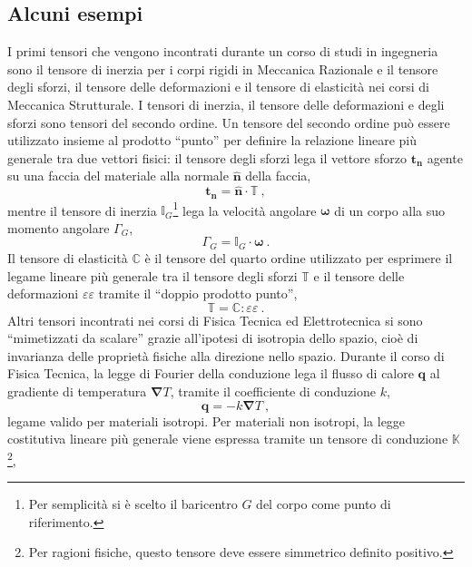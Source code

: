 \subsection{Alcuni esempi}
 I primi tensori che vengono incontrati durante un corso di studi in ingegneria sono il tensore di inerzia per i corpi rigidi in Meccanica Razionale e il tensore degli sforzi, il tensore delle deformazioni e il tensore di elasticità nei corsi di Meccanica Strutturale.
 I tensori di inerzia, il tensore delle deformazioni e degli sforzi sono tensori del secondo ordine. Un tensore del secondo ordine può essere utilizzato insieme al prodotto ``punto'' per definire la relazione lineare più generale tra due vettori fisici: il tensore degli sforzi lega il vettore sforzo $\bm{t_n}$ agente su una faccia del materiale alla normale $\bm{\hat{n}}$ della faccia,
 \begin{equation}\label{eqn:tensor:stressTensor}
     \bm{t_n} = \bm{\hat{n}} \cdot \mathbb{T} \ ,
 \end{equation}
 mentre il tensore di inerzia $\mathbb{I}_G$\footnote{Per semplicità si è scelto il baricentro $G$ del corpo come punto di riferimento.} lega la velocità angolare $\bm{\omega}$ di un corpo alla suo momento angolare $\Gamma_G$,
 \begin{equation}
  \Gamma_G = \mathbb{I}_G \cdot \bm{\omega} \ .
 \end{equation}
\newline
Il tensore di elasticità $\mathbb{C}$ è il tensore del quarto ordine utilizzato per esprimere il legame lineare più generale tra il tensore degli sforzi $\mathbb{T}$ e il tensore delle deformazioni $\varepsilon\!\!\varepsilon$ tramite il ``doppio prodotto punto'',
\begin{equation}
    \mathbb{T} = \mathbb{C} : \varepsilon\!\!\varepsilon \ .
\end{equation}
 Altri tensori incontrati nei corsi di Fisica Tecnica ed Elettrotecnica si sono ``mimetizzati da scalare'' grazie all'ipotesi di isotropia dello spazio, cioè di invarianza delle proprietà fisiche alla direzione nello spazio. Durante il corso di Fisica Tecnica, la legge di Fourier della conduzione lega il flusso di calore $\bm{q}$ al gradiente di temperatura $\bm{\nabla} T$, tramite il coefficiente di conduzione $k$,
 \begin{equation}
   \bm{q} = - k \bm{\nabla} T \ ,
 \end{equation}
legame valido per materiali isotropi. Per materiali non isotropi, la legge costitutiva lineare più generale viene espressa tramite un tensore di conduzione $\mathbb{K}$\footnote{Per ragioni fisiche, questo tensore deve essere simmetrico definito positivo.},
